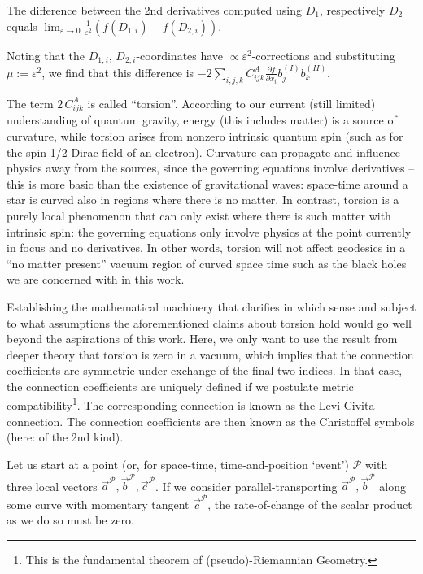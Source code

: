 \documentclass[twocolumn]{article}
\begin{document}
The difference between the 2nd derivatives computed using $D_1$,
respectively $D_2$ equals
$\lim_{\varepsilon\to 0}\frac{1}{\varepsilon^2}\left(f(D_{1,i})-f(D_{2,i})\right)$.

Noting that the $D_{1,i},\,D_{2,i}$-coordinates have
$\propto\varepsilon^2$-corrections and substituting
$\mu:=\varepsilon^2$, we find that this difference is $-2\sum_{i,j,k}
C^A_{ijk}\frac{\partial f}{\partial x_i}b^{(I)}_jb^{(II)}_k$.

The term $2\,C^A_{ijk}$ is called ``torsion''. According to our
current (still limited) understanding of quantum gravity, energy (this
includes matter) is a source of curvature, while torsion arises from
nonzero intrinsic quantum spin (such as for the spin-1/2 Dirac field
of an electron). Curvature can propagate and influence physics away
from the sources, since the governing equations involve derivatives --
this is more basic than the existence of gravitational waves:
space-time around a star is curved also in regions where there is no
matter. In contrast, torsion is a purely local phenomenon that can
only exist where there is such matter with intrinsic spin: the
governing equations only involve physics at the point currently in
focus and no derivatives. In other words, torsion will not affect
geodesics in a ``no matter present'' vacuum region of curved space
time such as the black holes we are concerned with in this work.

Establishing the mathematical machinery that clarifies in which sense
and subject to what assumptions the aforementioned claims about
torsion hold would go well beyond the aspirations of this work. Here,
we only want to use the result from deeper theory that torsion is zero
in a vacuum, which implies that the connection coefficients are
symmetric under exchange of the final two indices. In that case, the
connection coefficients are uniquely defined if we postulate metric
compatibility\footnote{This is the fundamental theorem of
  (pseudo)-Riemannian Geometry.}. The corresponding connection is
known as the Levi-Civita connection. The connection coefficients are
then known as the Christoffel symbols (here: of the 2nd kind).

Let us start at a point (or, for space-time, time-and-position
`event') $\mathcal P$ with three local vectors
$\vec a^{\mathcal P}, \vec b^{\mathcal P}, \vec c^{\mathcal P}$.
If we consider parallel-transporting $\vec a^{\mathcal P}, \vec b^{\mathcal P}$
along some curve with momentary tangent $\vec c^{\mathcal P}$,
the rate-of-change of the scalar product as we do so must be zero.
\end{document}
